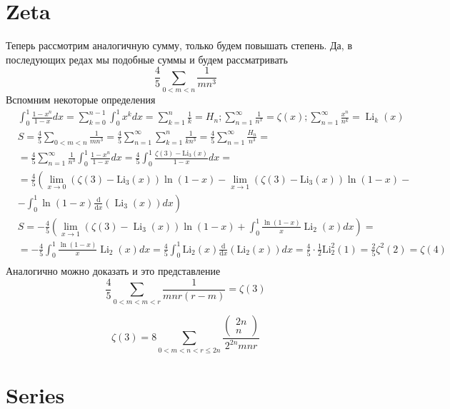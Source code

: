 

	\section{Zeta}
	
	Теперь рассмотрим аналогичную сумму, только будем повышать степень. Да, в последующих редах мы подобные суммы и будем рассматривать
	$$
	\frac{4}{5} \sum_{0<m<n} \frac{1}{m n^3}
	$$
	Вспомним некоторые определения
	$$
	\begin{aligned}
		& \int_0^1 \frac{1-x^n}{1-x} d x=\sum_{k=0}^{n-1} \int_0^1 x^k d x=\sum_{k=1}^n \frac{1}{k}=H_n ; \sum_{n=1}^{\infty} \frac{1}{n^x}=\zeta(x) ; \sum_{n=1}^{\infty} \frac{x^n}{n^k}=\operatorname{Li}_k(x) \\
		& S=\frac{4}{5} \sum_{0<m<n} \frac{1}{m n^3}=\frac{4}{5} \sum_{n=1}^{\infty} \sum_{k=1}^n \frac{1}{k n^3}=\frac{4}{5} \sum_{n=1}^{\infty} \frac{H_n}{n^3}= \\
		& =\frac{4}{5} \sum_{n=1}^{\infty} \frac{1}{n^3} \int_0^1 \frac{1-x^n}{1-x} d x=\frac{4}{5} \int_0^1 \frac{\zeta(3)-\mathrm{Li}_3(x)}{1-x} d x= \\
		& =\frac{4}{5}\left(\lim _{x \rightarrow 0}\left(\zeta(3)-\mathrm{Li}_3(x)\right) \ln (1-x)-\lim _{x \rightarrow 1}\left(\zeta(3)-\mathrm{Li}_3(x)\right) \ln (1-x)-\right. \\
		& \left.-\int_0^1 \ln (1-x) \frac{\mathrm{d}}{\mathrm{d} x}\left(\operatorname{Li}_3(x)\right) d x\right) \\
		& S=-\frac{4}{5}\left(\lim _{x \rightarrow 1}\left(\zeta(3)-\operatorname{Li}_3(x)\right) \ln (1-x)+\int_0^1 \frac{\ln (1-x)}{x} \operatorname{Li}_2(x) d x\right)= \\
		& =-\frac{4}{5} \int_0^1 \frac{\ln (1-x)}{x} \operatorname{Li}_2(x) d x=\frac{4}{5} \int_0^1 \mathrm{Li}_2(x) \frac{\mathrm{d}}{\mathrm{d} x}\left(\mathrm{Li}_2(x)\right) d x=\frac{4}{5} \cdot \frac{1}{2} \mathrm{Li}_2^2(1)=\frac{2}{5} \zeta^2(2)=\zeta(4) \\
		&
	\end{aligned}
	$$
	Аналогично можно доказать и это представление
	$$
	\frac{4}{5} \sum_{0<m<m<r} \frac{1}{m n r(r-m)}=\zeta(3)
	$$
	
	$$
	\zeta(3)=8 \sum_{0<m<n<r \leq 2 n} \frac{\left(\begin{array}{c}
			2 n \\
			n
		\end{array}\right)}{2^{2 n} m n r}
	$$
	
	\section{Series}
